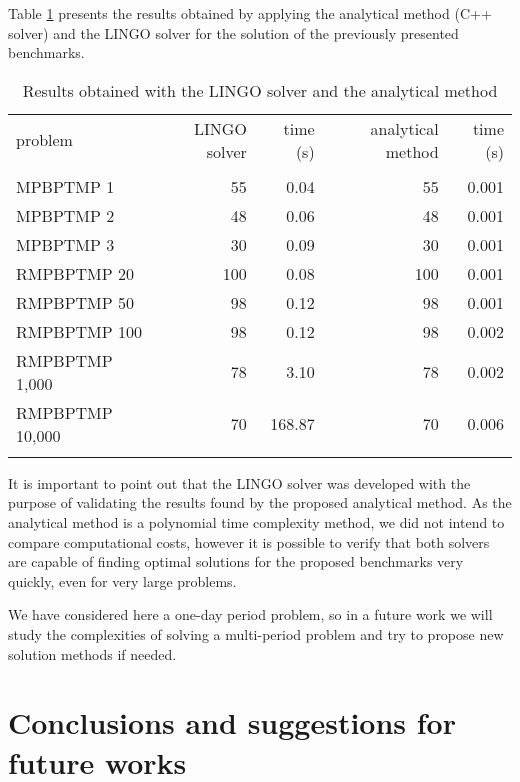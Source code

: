 \documentclass[authoryear,preprint,12pt]{elsarticle}
\begin{document}
Table \ref{tab:results} presents the results obtained by applying the analytical method (C++ solver) and the LINGO solver for the solution of the previously presented benchmarks.

\begin{table}[h]
\begin{center}
\begin{footnotesize}
\begin{tabular}[c]{l r r r r}
problem & LINGO solver & time (s) & analytical method & time (s) \\
\cline {1-5} \\
MPBPTMP 1 & 55 & 0.04 & 55 & 0.001 \\
MPBPTMP 2 & 48 & 0.06 & 48 & 0.001 \\
MPBPTMP 3 & 30 & 0.09 & 30 & 0.001 \\
RMPBPTMP 20 & 100 & 0.08 & 100 & 0.001 \\
RMPBPTMP 50 & 98 & 0.12 & 98 & 0.001\\
RMPBPTMP 100 & 98 & 0.12 & 98 & 0.002\\
RMPBPTMP 1,000 & 78 & 3.10 & 78 & 0.002\\
RMPBPTMP 10,000 & 70 & 168.87 & 70 & 0.006 \\
\cline {1-5} \\
\end{tabular}
\caption{Results obtained with the LINGO solver and the analytical method}
\label{tab:results}
\end{footnotesize}
\end{center}
\end{table}

It is important to point out that the LINGO solver was developed with the purpose of validating the results found by the proposed analytical method. As the analytical method is a polynomial time complexity method, we did not intend to compare computational costs, however it is possible to verify that both solvers are capable of finding optimal solutions for the proposed benchmarks very quickly, even for very large problems.

We have considered here a one-day period problem, so in a future work we will study the complexities of solving a multi-period problem and try to propose new solution methods if needed. 

\section{Conclusions and suggestions for future works}
\label{sec:conclusions}
\end{document}

